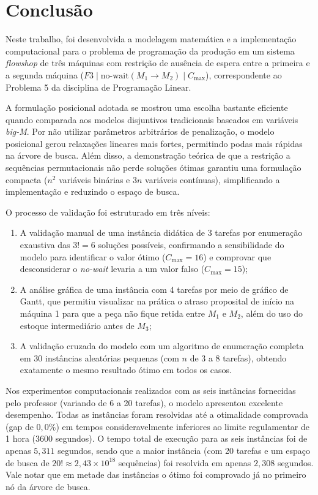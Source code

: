 \documentclass[11pt,a4paper]{article}
\begin{document}
\section{Conclusão}
\label{sec:conclusao}

Neste trabalho, foi desenvolvida a modelagem matemática e a implementação computacional para o problema de programação da produção em um sistema \textit{flowshop} de três máquinas com restrição de ausência de espera entre a primeira e a segunda máquina ($F3 \mid \text{no-wait}(M_1 \to M_2) \mid C_{\max}$), correspondente ao Problema 5 da disciplina de Programação Linear.

A formulação posicional adotada se mostrou uma escolha bastante eficiente quando comparada aos modelos disjuntivos tradicionais baseados em variáveis \textit{big-M}. Por não utilizar parâmetros arbitrários de penalização, o modelo posicional gerou relaxações lineares mais fortes, permitindo podas mais rápidas na árvore de busca. Além disso, a demonstração teórica de que a restrição a sequências permutacionais não perde soluções ótimas garantiu uma formulação compacta ($n^2$ variáveis binárias e $3n$ variáveis contínuas), simplificando a implementação e reduzindo o espaço de busca.

O processo de validação foi estruturado em três níveis:
\begin{enumerate}
    \item A validação manual de uma instância didática de 3 tarefas por enumeração exaustiva das $3! = 6$ soluções possíveis, confirmando a sensibilidade do modelo para identificar o valor ótimo ($C_{\max} = 16$) e comprovar que desconsiderar o \textit{no-wait} levaria a um valor falso ($C_{\max} = 15$);
    \item A análise gráfica de uma instância com 4 tarefas por meio de gráfico de Gantt, que permitiu visualizar na prática o atraso proposital de início na máquina 1 para que a peça não fique retida entre $M_1$ e $M_2$, além do uso do estoque intermediário antes de $M_3$;
    \item A validação cruzada do modelo com um algoritmo de enumeração completa em 30 instâncias aleatórias pequenas (com $n$ de 3 a 8 tarefas), obtendo exatamente o mesmo resultado ótimo em todos os casos.
\end{enumerate}

Nos experimentos computacionais realizados com as seis instâncias fornecidas pelo professor (variando de 6 a 20 tarefas), o modelo apresentou excelente desempenho. Todas as instâncias foram resolvidas até a otimalidade comprovada (gap de $0{,}0\%$) em tempos consideravelmente inferiores ao limite regulamentar de 1 hora (3600 segundos). O tempo total de execução para as seis instâncias foi de apenas $5{,}311$ segundos, sendo que a maior instância (com 20 tarefas e um espaço de busca de $20! \approx 2{,}43 \times 10^{18}$ sequências) foi resolvida em apenas $2{,}308$ segundos. Vale notar que em metade das instâncias o ótimo foi comprovado já no primeiro nó da árvore de busca.
\end{document}
